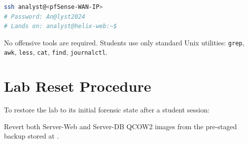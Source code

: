 \begin{lstlisting}[language=bash]
ssh analyst@<pfSense-WAN-IP>
# Password: An@lyst2024
# Lands on: analyst@helix-web:~$
\end{lstlisting}

No offensive tools are required. Students use only standard Unix utilities:
\texttt{grep}, \texttt{awk}, \texttt{less}, \texttt{cat}, \texttt{find},
\texttt{journalctl}.

\section*{Lab Reset Procedure}

To restore the lab to its initial forensic state after a student session:

\noindent Revert both Server-Web and Server-DB QCOW2 images from
the pre-staged backup stored at .
